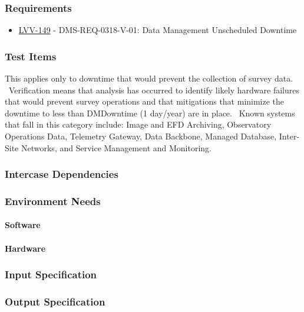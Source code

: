 \subsubsection{Requirements}
\begin{itemize}
\item \href{https://jira.lsstcorp.org/browse/LVV-149}{LVV-149} - DMS-REQ-0318-V-01: Data Management Unscheduled Downtime
\end{itemize}

\subsubsection{Test Items}
This applies only to downtime that would prevent the collection of
survey data. ~Verification means that analysis has occurred to identify
likely hardware failures that would prevent survey operations and that
mitigations that minimize the downtime to less than DMDowntime (1
day/year) are in place. ~Known systems that fall in this category
include: Image and EFD Archiving, Observatory Operations Data, Telemetry
Gateway, Data Backbone, Managed Database, Inter-Site Networks, and
Service Management and Monitoring.~



\subsubsection{Intercase Dependencies}

\subsubsection{Environment Needs}

\paragraph{Software}

\paragraph{Hardware}

\subsubsection{Input Specification}

\subsubsection{Output Specification}

